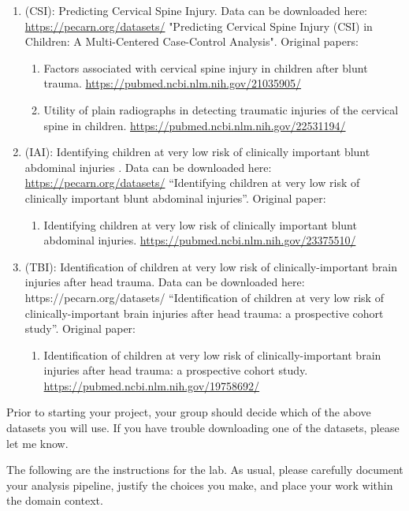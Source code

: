 \documentclass[letterpaper,12pt]{article}
\begin{document}
\begin{enumerate}
    \item (CSI): Predicting Cervical Spine Injury. Data can be downloaded here: \url{https://pecarn.org/datasets/} "Predicting Cervical Spine Injury (CSI) in Children: A Multi-Centered Case-Control Analysis". Original papers:
        \begin{enumerate}
            \item Factors associated with cervical spine injury in children after blunt trauma. \url{https://pubmed.ncbi.nlm.nih.gov/21035905/}
            \item Utility of plain radiographs in detecting traumatic injuries of the cervical spine in children. \url{https://pubmed.ncbi.nlm.nih.gov/22531194/}
        \end{enumerate}
    \item (IAI): Identifying children at very low risk of clinically important blunt abdominal injuries . Data can be downloaded here: \url{https://pecarn.org/datasets/} ``Identifying children at very low risk of clinically important blunt abdominal injuries''. Original paper:
        \begin{enumerate}
            \item Identifying children at very low risk of clinically important blunt abdominal injuries. \url{https://pubmed.ncbi.nlm.nih.gov/23375510/}
        \end{enumerate}
    \item (TBI): Identification of children at very low risk of clinically-important brain injuries after head trauma. Data can be downloaded here: https://pecarn.org/datasets/ ``Identification of children at very low risk of clinically-important brain injuries after head trauma: a prospective cohort study''. Original paper:
        \begin{enumerate}
            \item Identification of children at very low risk of clinically-important brain injuries after head trauma: a prospective cohort study. \url{https://pubmed.ncbi.nlm.nih.gov/19758692/}
        \end{enumerate}
\end{enumerate}

Prior to starting your project, your group should decide which of the above datasets you will use. If you have trouble downloading one of the datasets, please let me know.

The following are the instructions for the lab. As usual, please carefully document your analysis pipeline, justify the choices you make, and place your work within the domain context.
\end{document}
